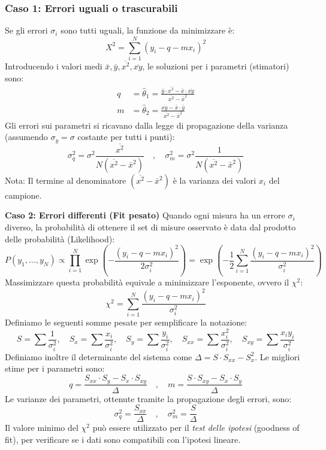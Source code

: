 \documentclass{article}
\theoremstyle{remark}
\begin{document}
\subsubsection*{Caso 1: Errori uguali o trascurabili}
Se gli errori $\sigma_i$ sono tutti uguali, la funzione da minimizzare è:
\[
X^2 = \sum_{i=1}^{N} (y_i - q - m x_i)^2
\]
Introducendo i valori medi $\bar{x}, \bar{y}, \overline{x^2}, \overline{xy}$, le soluzioni per i parametri (stimatori) sono:
\[ 
\begin{split}
q &= \hat{\theta}_1 = \frac{\bar{y} \cdot \overline{x^2} - \bar{x} \cdot \overline{xy}}{\overline{x^2} - \bar{x}^2} \\
m &= \hat{\theta}_2 = \frac{\overline{xy} - \bar{x} \cdot \bar{y}}{\overline{x^2} - \bar{x}^2}
\end{split}
\]
Gli errori sui parametri si ricavano dalla legge di propagazione della varianza (assumendo $\sigma_y = \sigma$ costante per tutti i punti):
\[
\sigma_q^2 = \sigma^2 \frac{\overline{x^2}}{N(\overline{x^2}-\bar{x}^2)}
\quad , \quad
\sigma_m^2 = \sigma^2 \frac{1}{N(\overline{x^2}-\bar{x}^2)}
\]
Nota: Il termine al denominatore $(\overline{x^2}-\bar{x}^2)$ è la varianza dei valori $x_i$ del campione.

\textbf{Caso 2: Errori differenti (Fit pesato)}
Quando ogni misura ha un errore $\sigma_i$ diverso, la probabilità di ottenere il set di misure osservato è data dal prodotto delle probabilità (Likelihood):
\[ P(y_1, \ldots, y_N) \propto \prod_{i=1}^N \exp\left( -\frac{(y_i - q - m x_i)^2}{2\sigma_i^2} \right) = \exp\left( -\frac{1}{2} \sum_{i=1}^N \frac{(y_i - q - m x_i)^2}{\sigma_i^2} \right) \]
Massimizzare questa probabilità equivale a minimizzare l'esponente, ovvero il $\chi^2$:
\[ \chi^2 = \sum_{i=1}^N \frac{(y_i - q - m x_i)^2}{\sigma_i^2} \]
Definiamo le seguenti somme pesate per semplificare la notazione:
\[
S = \sum \frac{1}{\sigma_i^2}, \quad S_x = \sum \frac{x_i}{\sigma_i^2}, \quad S_y = \sum \frac{y_i}{\sigma_i^2}, \quad S_{xx} = \sum \frac{x_i^2}{\sigma_i^2}, \quad S_{xy} = \sum \frac{x_i y_i}{\sigma_i^2}
\]
Definiamo inoltre il determinante del sistema come $\Delta = S \cdot S_{xx} - S_x^2$.
Le migliori stime per i parametri sono:
\[
q = \frac{S_{xx} \cdot S_y - S_x \cdot S_{xy}}{\Delta}
\quad , \quad
m = \frac{S \cdot S_{xy} - S_x \cdot S_y}{\Delta}
\]
Le varianze dei parametri, ottenute tramite la propagazione degli errori, sono:
\[
\sigma_q^2 = \frac{S_{xx}}{\Delta}
\quad , \quad
\sigma_m^2 = \frac{S}{\Delta}
\]
Il valore minimo del $\chi^2$ può essere utilizzato per il \textit{test delle ipotesi} (goodness of fit), per verificare se i dati sono compatibili con l'ipotesi lineare.
\end{document}
